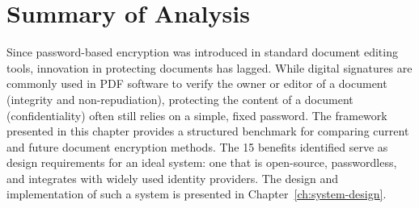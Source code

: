 \section{Summary of Analysis}
\label{sec:eval-summary}

Since password-based encryption was introduced in standard document editing tools, innovation in protecting documents has lagged. While digital signatures are commonly used in PDF software to verify the owner or editor of a document (integrity and non-repudiation), protecting the content of a document (confidentiality) often still relies on a simple, fixed password. The framework presented in this chapter provides a structured benchmark for comparing current and future document encryption methods. The 15 benefits identified serve as design requirements for an ideal system: one that is open-source, passwordless, and integrates with widely used identity providers. The design and implementation of such a system is presented in Chapter~\ref{ch:system-design}.
